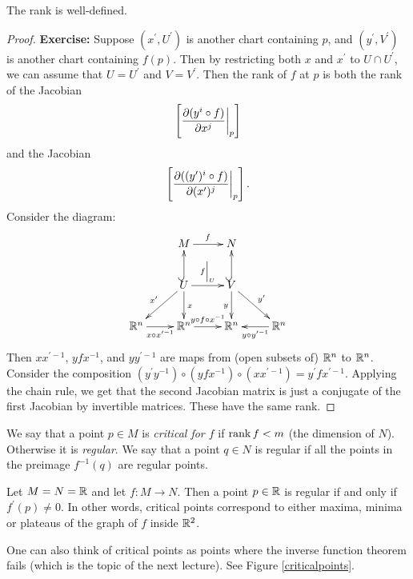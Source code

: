 \documentclass[11pt, english]{article}
\begin{document}
\begin{prop}
The rank is well-defined.
\end{prop}
\begin{proof}
 \textbf{Exercise:} Suppose $(x^\prime,U^\prime)$ is another chart containing $p$, and $(y^\prime,V^\prime)$ is another chart containing $f(p)$. Then by restricting both $x$ and $x^\prime$ to $U \cap U^\prime$, we can assume that $U=U^\prime$ and $V=V^\prime$. Then the rank of $f$ at $p$ is both the rank of the Jacobian
\[
\left[ \restr{\dd{(y^i \circ f)}{x^j}}p \right]
\]
and the Jacobian
\[
\left[ \restr{\dd{((y^\prime)^i \circ f)}{(x^\prime)^j}}p \right].
\]
Consider the diagram:
\[
\xymatrix{
& M \ar[r]^f & N \\
& \ar[dl]_{x^\prime} U \ar@{^(->}[u] \ar[d]^x \ar[r]^{\restr fU} & V \ar@{^(->}[u] \ar[d]_y  \ar[dr]^{y^\prime}\\
\R^n \ar[r]_{x \circ x^{\prime -1}} & \R^n \ar[r]^{y \circ f \circ x^{-1}} & \R^n & \ar[l]^{y \circ y^{\prime -1}}\R^n
}
\]
Then $xx^{\prime -1}$, $yfx^{-1}$, and $y y^{\prime -1}$ are maps from (open subsets of) $\mathbb{R}^n$ to $\mathbb{R}^n$. Consider the composition $(y^\prime y^{-1}) \circ (yfx^{-1}) \circ (xx^{\prime -1})=y^\prime f x^{\prime -1}$. Applying the chain rule, we get that the second Jacobian matrix is just a conjugate of the first Jacobian by invertible matrices. These have the same rank.
\end{proof}

We say that a point $p \in M$ is \emph{critical for $f$} if $\operatorname{\mathrm{rank}} f < m$ (the dimension of $N$). Otherwise it is \emph{regular}. We say that a point $q \in N$ is regular if all the points in the preimage $f^{-1}(q)$ are regular points.

\begin{example}
Let $M=N=\mathbb{R}$ and let $f:M \to N$. Then a point $p \in \mathbb{R}$ is regular if and only if $f^\prime(p) \neq 0$. In other words, critical points correspond to either maxima, minima or plateaus of the graph of $f$ inside $\mathbb{R}^2$.

One can also think of critical points as points where the inverse function theorem fails (which is the topic of the next lecture). See Figure \ref{criticalpoints}. %
\end{example}
\end{document}
